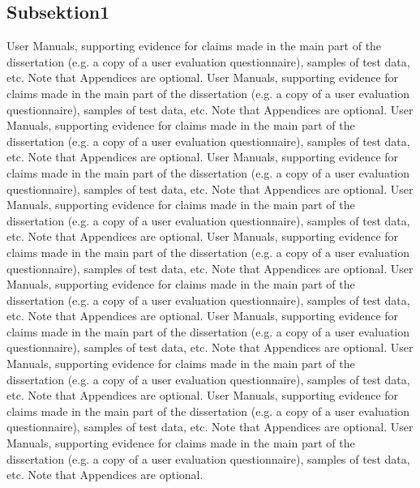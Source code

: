 \begin{appendices}
\subsection{Subsektion1}
User Manuals, supporting evidence for claims made in the main part of the dissertation (e.g. a copy of a user evaluation questionnaire), samples of test data, etc. Note that Appendices are optional.
User Manuals, supporting evidence for claims made in the main part of the dissertation (e.g. a copy of a user evaluation questionnaire), samples of test data, etc. Note that Appendices are optional.
User Manuals, supporting evidence for claims made in the main part of the dissertation (e.g. a copy of a user evaluation questionnaire), samples of test data, etc. Note that Appendices are optional.
User Manuals, supporting evidence for claims made in the main part of the dissertation (e.g. a copy of a user evaluation questionnaire), samples of test data, etc. Note that Appendices are optional.
User Manuals, supporting evidence for claims made in the main part of the dissertation (e.g. a copy of a user evaluation questionnaire), samples of test data, etc. Note that Appendices are optional.
User Manuals, supporting evidence for claims made in the main part of the dissertation (e.g. a copy of a user evaluation questionnaire), samples of test data, etc. Note that Appendices are optional.
User Manuals, supporting evidence for claims made in the main part of the dissertation (e.g. a copy of a user evaluation questionnaire), samples of test data, etc. Note that Appendices are optional.
User Manuals, supporting evidence for claims made in the main part of the dissertation (e.g. a copy of a user evaluation questionnaire), samples of test data, etc. Note that Appendices are optional.
User Manuals, supporting evidence for claims made in the main part of the dissertation (e.g. a copy of a user evaluation questionnaire), samples of test data, etc. Note that Appendices are optional.
User Manuals, supporting evidence for claims made in the main part of the dissertation (e.g. a copy of a user evaluation questionnaire), samples of test data, etc. Note that Appendices are optional.
User Manuals, supporting evidence for claims made in the main part of the dissertation (e.g. a copy of a user evaluation questionnaire), samples of test data, etc. Note that Appendices are optional.

\end{appendices}
